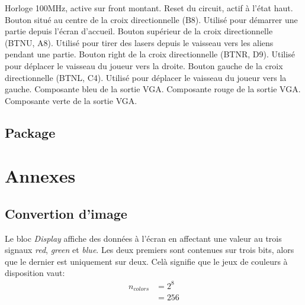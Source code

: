 \documentclass[french]{nakrule}
\begin{document}
\begin{descr}
   Horloge 100MHz, active sur front montant.
   Reset du circuit, actif à l'état haut.
   Bouton situé au centre de la croix directionnelle (B8).
  Utilisé pour démarrer une partie depuis l'écran d'accueil.
   Bouton supérieur de la croix directionnelle (BTNU, A8).
  Utilisé pour tirer des lasers depuis le vaisseau vers les aliens pendant une partie.
   Bouton right de la croix directionnelle (BTNR, D9). Utilisé
  pour déplacer le vaisseau du joueur vers la droite.
   Bouton gauche de la croix directionnelle (BTNL, C4). Utilisé
  pour déplacer le vaisseau du joueur vers la gauche.
   Composante bleu de la sortie VGA.
   Composante rouge de la sortie VGA.
   Composante verte de la sortie VGA.
\end{descr}

\clearpage


\section{Package}
\label{sec:package}

\asymmetricalPage
\chapter{Annexes}

\symmetricalPage

\section{Convertion d'image}
\label{sec:convertPicture}

Le bloc \emph{Display} affiche des données à l'écran en affectant une valeur au
trois signaux \emph{red}, \emph{green} et \emph{blue}. Les deux premiers sont
contenues sur trois bits, alors que le dernier est uniquement sur deux. Celà
signifie que le jeux de couleurs à disposition vaut:
\begin{align*}
  n_{colors} &= 2^{8}\\
             &= 256
\end{align*}
\end{document}

